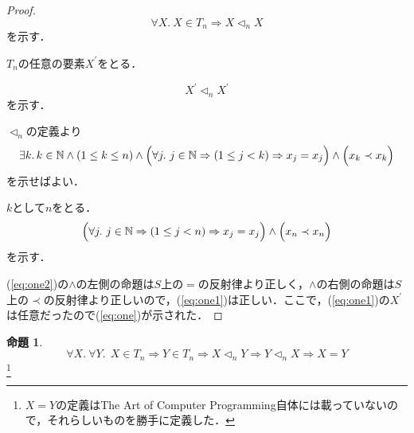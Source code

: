 \documentclass[11pt,dvipdfmx]{jarticle}
\theoremstyle{definition}
\newtheorem{proposition}{命題}[section]
\begin{document}
\begin{proof}
\begin{equation}
 \forall X. \ X \in T_{n} \Rightarrow X \lhd_{n} X
 \label{eq:one}
\end{equation}
を示す．\par
\noindent $T_{n}$の任意の要素$X^{'}$をとる．\par
\begin{equation}
 X^{'} \lhd_{n} X^{'}
 \label{eq:one1}
\end{equation}
を示す．\par
\noindent $\lhd_{n}$の定義より
\begin{equation}
\exists k. \, k \in \mathbb{N} \land (1 \leq k \leq n) \land \Bigl( \forall j. \ j \in \mathbb{N} \Rightarrow (1 \leq j < k) \Rightarrow  x_{j} = x_{j} \Bigr) \land \Bigl( x_{k} \prec x_{k} \Bigr)
\end{equation}
を示せばよい．\par
\noindent $k$として$n$をとる．
\begin{equation}
\Bigl( \forall j. \ j \in \mathbb{N} \Rightarrow (1 \leq j < n) \Rightarrow  x_{j} = x_{j} \Bigr) \land \Bigl( x_{n} \prec x_{n} \Bigr)
 \label{eq:one2}
\end{equation}
を示す．\par
\noindent (\ref{eq:one2})の$\land$の左側の命題は$S$上の$=$の反射律より正しく，$\land$の右側の命題は$S$上の$\prec$の反射律より正しいので，(\ref{eq:one1})は正しい．ここで，(\ref{eq:one1})の$X^{'}$は任意だったので(\ref{eq:one})が示された．
\end{proof}

\begin{proposition}
\[
\forall X. \ \forall Y. \ \ X \in T_{n} \Rightarrow Y \in T_{n} \Rightarrow X \lhd_{n} Y \Rightarrow Y \lhd_{n} X \Rightarrow X = Y
\]
\footnote{$X = Y$の定義はThe Art of Computer Programming自体には載っていないので，それらしいものを勝手に定義した．}
\end{proposition}
\end{document}

